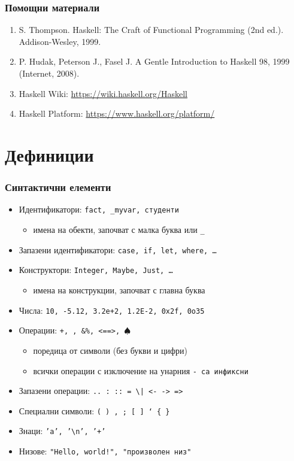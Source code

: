 \documentclass{beamer}
\begin{document}
\begin{frame}
  \frametitle{Помощни материали}
  \begin{enumerate}
  \item S. Thompson. Haskell: The Craft of Functional Programming (2nd ed.). Addison-Wesley, 1999.
  \item P. Hudak, Peterson J., Fasel J. A Gentle Introduction to Haskell 98, 1999 (Internet, 2008).
  \item Haskell Wiki: \url{https://wiki.haskell.org/Haskell}
  \item Haskell Platform: \url{https://www.haskell.org/platform/}
  \end{enumerate}
\end{frame}

\section{Дефиниции}

\begin{frame}
  \frametitle{Синтактични елементи}
  \begin{itemize}
  \item Идентификатори: \tt{fact}, \tt{\_myvar}, \tt{студенти}
    \begin{itemize}
    \item имена на обекти, започват с малка буква или \tt\_
    \end{itemize}
  \item Запазени идентификатори: \tt{case}, \tt{if}, \tt{let}, \tt{where}, \ldots
  \item Конструктори: \tt{Integer}, \tt{Maybe}, \tt{Just}, \ldots
    \begin{itemize}
    \item имена на конструкции, започват с главна буква
    \end{itemize}
  \item Числа: \tt{10}, \tt{-5.12}, \tt{3.2e+2}, \tt{1.2E-2}, \tt{0x2f}, \tt{0o35} 
  \item Операции: \tt+, \tt*, \tt{\&\%}, \tt{<==>}, \tt{$\spadesuit$}
    \begin{itemize}
    \item поредица от символи (без букви и цифри)
    \item всички операции с изключение на унарния \tt- са инфиксни
    \end{itemize}
  \item Запазени операции: \tt{..} \tt: \tt{::} \tt= \tt\textbackslash \tt| \tt{<-} \tt{->} \tt@ \tt\~ \tt{=>}
  \item Специални символи: \tt( \tt) \tt, \tt; \tt[ \tt] \tt` \tt\{ \tt\}
  \item Знаци: \tt{'a'}, \tt{'\textbackslash n'}, \tt{'+'}
  \item Низове: \tt{"Hello, world!"}, \tt{"произволен низ"}
  \end{itemize}
\end{frame}
\end{document}
